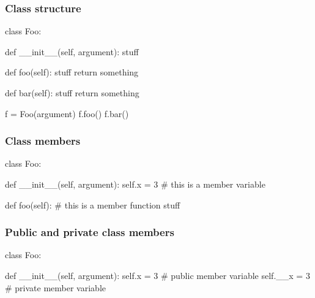 
\begin{frame}[fragile]
  \frametitle{Class structure}

\begin{python}
class Foo:

    def __init__(self, argument):
        stuff

    def foo(self):
        stuff
        return something

    def bar(self):
        stuff
        return something

f = Foo(argument)
f.foo()
f.bar()
\end{python}

\end{frame}

\begin{frame}[fragile]
  \frametitle{Class members}

\begin{python}
class Foo:

    def __init__(self, argument):
        self.x = 3  # this is a member variable

    def foo(self):  # this is a member function
        stuff
\end{python}

\end{frame}

\begin{frame}[fragile]
  \frametitle{Public and private class members}

\begin{python}
class Foo:

    def __init__(self, argument):
        self.x = 3   # public member variable
        self.__x = 3 # private member variable
\end{python}

\end{frame}
